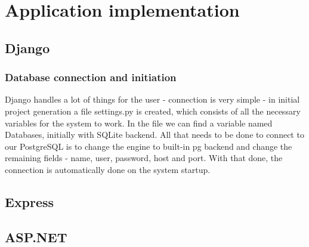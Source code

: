 
\chapter{Application implementation}

\section{Django}

\subsection{Database connection and initiation}

Django handles a lot of things for the user - connection is very simple - in initial project generation a file settings.py is created, which consists of all the necessary variables for the system to work. In the file we can find a variable named Databases, initially with SQLite backend. All that needs to be done to connect to our PostgreSQL is to change the engine to built-in \acrshort{pg} backend and change the remaining fields - name, user, password, host and port. With that done, the connection is automatically done on the system startup.
\section{Express}
\section{ASP.NET}

